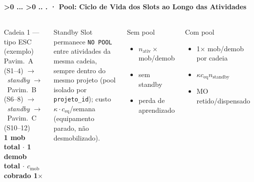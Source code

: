 \documentclass[aspectratio=169,10pt]{beamer}
\newcommand{\arr}{$\rightarrow$}
\newcounter{mlc3}[subsection]
\newcounter{mlc4}[mlc3]
\newcommand{\pathnum}{%
  \ifnum\value{mlc4}>0
    \thesection.\thesubsection.\arabic{mlc3}.\arabic{mlc4}%
  \else\ifnum\value{mlc3}>0
    \thesection.\thesubsection.\arabic{mlc3}%
  \else
    \thesection.\thesubsection%
  \fi\fi
}
\newcommand{\lvlA}{\stepcounter{mlc3}}   %
\newcommand{\mtitle}[1]{%
  \frametitle{\insertsection}%
  \framesubtitle{\pathnum\;·\; #1}}
\begin{document}
\lvlA
\begin{frame}
  \mtitle{Pool: Ciclo de Vida dos Slots ao Longo das Atividades}
  \begin{columns}[T]
    \begin{block}{Cadeia 1 --- tipo ESC (exemplo)}
      \scriptsize Pavim.\ A (S1--4) \arr\ \textit{standby}
      \arr\ Pavim.\ B (S6--8) \arr\ \textit{standby} \arr\
      Pavim.\ C (S10--12)\\[4pt]
      \textbf{1 mob total $\cdot$ 1 demob total $\cdot$ $c_{\text{mob}}$ cobrado 1$\times$}
    \end{block}
    \vspace{4pt}
    \begin{block}{Standby}
      \scriptsize Slot permanece \texttt{NO POOL} entre atividades da
      mesma cadeia, sempre dentro do mesmo projeto (pool isolado por
      \texttt{projeto\_id}); custo $\kappa \cdot c_{\text{eq}}$/semana
      (equipamento parado, não desmobilizado).
    \end{block}
    \begin{alertblock}{Sem pool}
      \begin{itemize}\scriptsize
        \item $n_{\text{ativ}}\times$ mob/demob
        \item sem standby
        \item perda de aprendizado
      \end{itemize}
    \end{alertblock}
    \vspace{4pt}
    \begin{exampleblock}{Com pool}
      \begin{itemize}\scriptsize
        \item 1$\times$ mob/demob por cadeia
        \item $\kappa c_{\text{eq}} n_{\text{standby}}$
        \item MO retido/dispensado
      \end{itemize}
    \end{exampleblock}
  \end{columns}
\end{frame}
\end{document}
